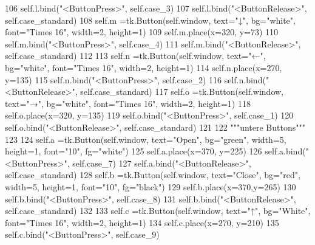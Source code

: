 \begin{DoxyCode}
106         self.l.bind(\textcolor{stringliteral}{"<ButtonPress>"}, self.case\_3)
107         self.l.bind(\textcolor{stringliteral}{"<ButtonRelease>"}, self.case\_standard)
108         self.m =tk.Button(self.window, text=\textcolor{stringliteral}{"↓"}, bg=\textcolor{stringliteral}{"white"}, font=\textcolor{stringliteral}{"Times 16"}, width=2, height=1)
109         self.m.place(x=320, y=73)
110         self.m.bind(\textcolor{stringliteral}{"<ButtonPress>"}, self.case\_4)
111         self.m.bind(\textcolor{stringliteral}{"<ButtonRelease>"}, self.case\_standard) 
112 
113         self.n =tk.Button(self.window, text=\textcolor{stringliteral}{"←"}, bg=\textcolor{stringliteral}{"white"}, font=\textcolor{stringliteral}{"Times 16"}, width=2, height=1)
114         self.n.place(x=270, y=135)
115         self.n.bind(\textcolor{stringliteral}{"<ButtonPress>"}, self.case\_2)
116         self.n.bind(\textcolor{stringliteral}{"<ButtonRelease>"}, self.case\_standard)
117         self.o =tk.Button(self.window, text=\textcolor{stringliteral}{"→"}, bg=\textcolor{stringliteral}{"white"}, font=\textcolor{stringliteral}{"Times 16"}, width=2, height=1)
118         self.o.place(x=320, y=135)
119         self.o.bind(\textcolor{stringliteral}{"<ButtonPress>"}, self.case\_1)
120         self.o.bind(\textcolor{stringliteral}{"<ButtonRelease>"}, self.case\_standard)
121 
122         \textcolor{stringliteral}{"""untere Buttons"""}
123         
124         self.a =tk.Button(self.window, text=\textcolor{stringliteral}{"Open"}, bg=\textcolor{stringliteral}{"green"}, width=5, height=1, font=\textcolor{stringliteral}{"10"}, fg=\textcolor{stringliteral}{"white"})
125         self.a.place(x=370, y=225)
126         self.a.bind(\textcolor{stringliteral}{"<ButtonPress>"}, self.case\_7)
127         self.a.bind(\textcolor{stringliteral}{"<ButtonRelease>"}, self.case\_standard)
128         self.b =tk.Button(self.window, text=\textcolor{stringliteral}{"Close"}, bg=\textcolor{stringliteral}{"red"}, width=5, height=1, font=\textcolor{stringliteral}{"10"}, fg=\textcolor{stringliteral}{"black"})
129         self.b.place(x=370,y=265)
130         self.b.bind(\textcolor{stringliteral}{"<ButtonPress>"}, self.case\_8)
131         self.b.bind(\textcolor{stringliteral}{"<ButtonRelease>"}, self.case\_standard)
132 
133         self.c =tk.Button(self.window, text=\textcolor{stringliteral}{"↑"}, bg=\textcolor{stringliteral}{"White"}, font=\textcolor{stringliteral}{"Times 16"}, width=2, height=1)
134         self.c.place(x=270, y=210)
135         self.c.bind(\textcolor{stringliteral}{"<ButtonPress>"}, self.case\_9)

\end{DoxyCode}
